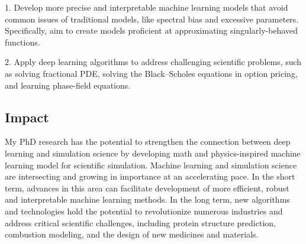 1. Develop more precise and interpretable machine learning models that avoid common issues of traditional models, like spectral bias and excessive parameters. Specifically, aim to create models proficient at approximating singularly-behaved functions.

2. Apply deep learning algorithms to address challenging scientific problems, such as solving fractional PDE, solving the Black–Scholes equations in option pricing, and learning phase-field equations.


\subsection{Impact}
My PhD research has the potential to strengthen the connection between deep learning and simulation science by developing math and physics-inspired machine learning model for scientific simulation. Machine learning and simulation science are intersecting and growing in importance at an accelerating pace. In the short term, advances in this area can facilitate development of more efficient, robust and interpretable machine learning methods. In the long term, new algorithms and technologies hold the potential to revolutionize numerous industries and address critical scientific challenges, including protein structure prediction, combustion modeling, and the design of new medicines and materials.


